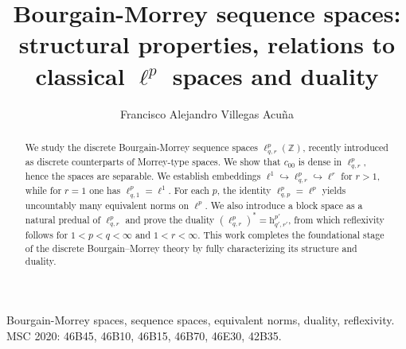 \documentclass[preprint,12pt]{elsarticle}
\begin{document}
\begin{frontmatter}


\author[1]{Francisco Alejandro Villegas Acuña}


\title{Bourgain-Morrey sequence spaces: structural properties, relations to classical \(\ell^{p}\) spaces and duality}







\begin{abstract}
We study the discrete Bourgain-Morrey sequence spaces $\ell^{p}_{q,r}(\mathbb{Z})$, 
recently introduced as discrete counterparts of Morrey-type spaces. 
We show that $c_{00}$ is dense in $\ell^{p}_{q,r}$, hence the spaces are separable. 
We establish embeddings $\ell^{1}\hookrightarrow \ell^{p}_{q,r}\hookrightarrow \ell^{r}$ for $r>1$, 
while for $r=1$ one has $\ell^{p}_{q,1}=\ell^{1}$. 
For each $p$, the identity $\ell^{p}_{q,p}=\ell^{p}$ yields uncountably many equivalent norms on $\ell^{p}$. 
We also introduce a block space as a natural predual of $\ell^{p}_{q,r}$ and prove the duality 
$(\ell^{p}_{q,r})^{*}=\mathrm{h}^{p'}_{q',r'}$, from which reflexivity follows for 
$1<p<q<\infty$ and $1<r<\infty$. 
This work completes the foundational stage of the discrete Bourgain–Morrey theory by fully characterizing its structure and duality.
\end{abstract}
\begin{keyword}
Bourgain-Morrey spaces, sequence spaces, equivalent norms, duality, reflexivity.\\
MSC 2020: 46B45, 46B10, 46B15, 46B70, 46E30, 42B35.


\end{keyword}
\end{frontmatter}
\end{document}
